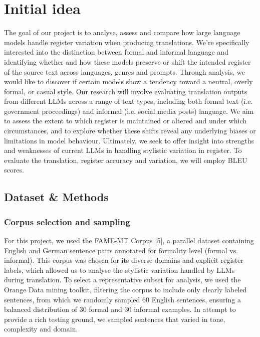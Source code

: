 \documentclass[fleqn,moreauthors,10pt]{ds_report}
\begin{document}
	
	
	
	\section*{Initial idea}
	The goal of our project is to analyse, assess and compare how large language models handle register variation when producing translations. We’re specifically interested into the distinction between formal and informal language and identifying whether and how these models preserve or shift the intended register of the source text across languages, genres and prompts. Through analysis, we would like to discover if certain models show a tendency toward a neutral, overly formal, or casual style.
	Our research will involve evaluating translation outputs from different LLMs across a range of text types, including both formal text (i.e. government proceedings) and informal (i.e. social media posts) language. We aim to assess the extent to which register is maintained or altered and under which circumstances, and to explore whether these shifts reveal any underlying biases or limitations in model behaviour. Ultimately, we seek to offer insight into strengths and weaknesses of current LLMs in handling stylistic variation in register.
	To evaluate the translation, register accuracy and variation, we will employ BLEU scores.
	
	
	\subsection*{Dataset \& Methods}
	
	\subsubsection*{Corpus selection and sampling}
	
For this project, we used the FAME-MT Corpus [5], a parallel dataset containing English and German sentence pairs annotated for formality level (formal vs. informal). This corpus was chosen for its diverse domains and explicit register labels, which allowed us to analyse the stylistic variation handled by LLMs during translation. 
To select a representative subset for analysis, we used the Orange Data mining toolkit, filtering the corpus to include only clearly labeled sentences, from which we randomly sampled 60 English sentences, ensuring a balanced distribution of 30 formal and 30 informal examples. In attempt to provide a rich testing ground, we sampled sentences that varied in tone, complexity and domain.
\end{document}
